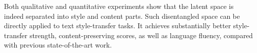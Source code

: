 \documentclass[letterpaper]{article} %
\begin{document}
Both qualitative and quantitative experiments show that the latent space is indeed separated into style and content parts.
Such  disentangled space can be directly applied to text style-transfer tasks.
It achieves substantially better style-transfer strength, content-preserving scores, as well as language fluency, compared with previous state-of-the-art work.



\end{document}
